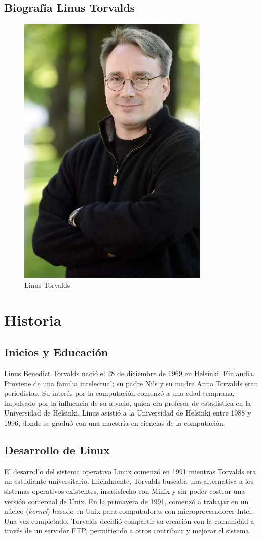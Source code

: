 \documentclass[11pt,twoside]{book}
\begin{document}
\subsection{{\bfseries Biografía Linus Torvalds}}
\begin{figure}[htb]
  \centering
  \includegraphics[width=0.3\linewidth]{L.T.png}
  \caption{Linus Torvalds}
  \label{fig:etiqueta}
\end{figure}
\vspace{5pt}
\section*{Historia}
\subsection*{Inicios y Educación}
Linus Benedict Torvalds nació el 28 de diciembre de 1969 en Helsinki, Finlandia. Proviene de una familia intelectual; su padre Nils y su madre Anna Torvalds eran periodistas. Su interés por la computación comenzó a una edad temprana, impulsado por la influencia de su abuelo, quien era profesor de estadística en la Universidad de Helsinki. Linus asistió a la Universidad de Helsinki entre 1988 y 1996, donde se graduó con una maestría en ciencias de la computación.

\subsection*{Desarrollo de Linux}
El desarrollo del sistema operativo Linux comenzó en 1991 mientras Torvalds era un estudiante universitario. Inicialmente, Torvalds buscaba una alternativa a los sistemas operativos existentes, insatisfecho con Minix y sin poder costear una versión comercial de Unix. En la primavera de 1991, comenzó a trabajar en un núcleo (\textit{kernel}) basado en Unix para computadoras con microprocesadores Intel. Una vez completado, Torvalds decidió compartir su creación con la comunidad a través de un servidor FTP, permitiendo a otros contribuir y mejorar el sistema.
\end{document}
